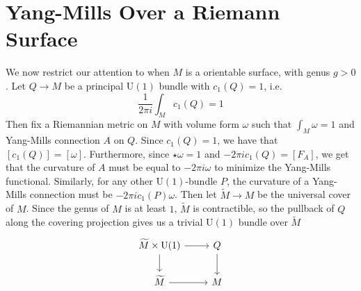 \documentclass[psamsfonts, 12pt]{amsart}
\theoremstyle{definition}
\theoremstyle{remark}
\newcommand{\C}{\mathbb{C}}
\newcommand{\dbar}{\overline{\partial}}
\newcommand{\g}{\mathfrak{g}}
\newcommand{\defeq}{\vcentcolon=}
\DeclareMathOperator{\id}{id}
\begin{document}
\section{Yang-Mills Over a Riemann Surface}
%
\iffalse
The Hodge star operator maps $\Omega^1_M \to \Omega^1_M$, and satisfies
$\star^2 = -\id$, which induces an almost complex structure on $M$, giving us a
decomposition $\Omega^1_M(\C) = \Omega^{1,0}_M(\C) \oplus \Omega^{0,1}_M(\C)$
into the $\pm i$ eigenspaces of the complexified Hodge star. The operator
$\dbar \defeq \pi^{0,1} \circ d$ (where $\pi^{0,1}$ denotes projection onto
$\Omega^{0,1}_M(\C)$) satisfies $\dbar^2 = 0$ since by dimension reasons,
$\Omega^{0,2}_M(\C) = 0$, so the induced almost complex structure is integrable by the
Newlander-Nirenberg theorem. The same argument with projection onto $\Omega^{1,0}_M(\C)$
gives an operator $\partial$ satisfying $\partial^2 = 0$, and we get a decomposition
$d = \partial + \dbar$. Then given a principal bundle $P \to M$, We get a similar
decomposition for $\Omega^1_M(\g_P)$ after complexification giving a decomposition
$d_A = \partial_A + \dbar_A$ for any connection $A \in \mathscr{A}(P)$.
\fi
We now restrict our attention to when $M$ is a orientable surface, with genus $g > 0$.
Let $Q \to M$ be a principal $\mathrm{U}(1)$ bundle with $c_1(Q) = 1$, i.e.
\[
\frac{1}{2\pi i} \int_M c_1(Q) = 1
\]
Then fix a Riemannian metric on $M$ with volume form $\omega$ such that
$\int_M \omega = 1$ and Yang-Mills connection $A$ on $Q$. Since $c_1(Q) = 1$, we have
that $[c_1(Q)] = [\omega]$. Furthermore, since $\star\omega = 1$ and
$-2\pi i c_1(Q) = [F_A]$, we get that the curvature of $A$ must be equal to
$-2\pi i \omega$ to minimize the Yang-Mills functional. Similarly, for any other
$\mathrm{U}(1)$-bundle $P$, the curvature of a Yang-Mills connection must be
$-2\pi i c_1(P)\omega$. Then let $\widetilde{M} \to M$ be the universal cover of $M$.
Since the genus of $M$ is at least $1$, $\widetilde{M}$
is contractible, so the pullback of $Q$ along the covering projection gives us a
trivial $\mathrm{U}(1)$ bundle over $\widetilde{M}$
\[\begin{tikzcd}
\widetilde{M} \times \mathrm{U}(1)\ar[d] \ar[r] & Q \ar[d]\\
\widetilde{M} \ar[r] & M
\end{tikzcd}\]
\end{document}
